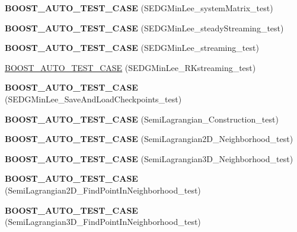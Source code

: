 \begin{DoxyCompactItemize}
\item 
\hypertarget{namespacenatrium_a7510cddf2a5057595ad4e7f3c7bddff8}{
{\bfseries BOOST\_\-AUTO\_\-TEST\_\-CASE} (SEDGMinLee\_\-systemMatrix\_\-test)}
\label{namespacenatrium_a7510cddf2a5057595ad4e7f3c7bddff8}

\item 
\hypertarget{namespacenatrium_ae9b4ffa9f8ace78360f43adc88f28bee}{
{\bfseries BOOST\_\-AUTO\_\-TEST\_\-CASE} (SEDGMinLee\_\-steadyStreaming\_\-test)}
\label{namespacenatrium_ae9b4ffa9f8ace78360f43adc88f28bee}

\item 
\hypertarget{namespacenatrium_a635e77494362fb2b4f16eefebcd688b3}{
{\bfseries BOOST\_\-AUTO\_\-TEST\_\-CASE} (SEDGMinLee\_\-streaming\_\-test)}
\label{namespacenatrium_a635e77494362fb2b4f16eefebcd688b3}

\item 
\hyperlink{namespacenatrium_a5d50c8f7b1a7391f2433de8b308a11e7}{BOOST\_\-AUTO\_\-TEST\_\-CASE} (SEDGMinLee\_\-RKstreaming\_\-test)
\item 
\hypertarget{namespacenatrium_ae770b0311667837cbe15679c4f642d8d}{
{\bfseries BOOST\_\-AUTO\_\-TEST\_\-CASE} (SEDGMinLee\_\-SaveAndLoadCheckpoints\_\-test)}
\label{namespacenatrium_ae770b0311667837cbe15679c4f642d8d}

\item 
\hypertarget{namespacenatrium_a883618d1bfe54362b6fe566b33a125c4}{
{\bfseries BOOST\_\-AUTO\_\-TEST\_\-CASE} (SemiLagrangian\_\-Construction\_\-test)}
\label{namespacenatrium_a883618d1bfe54362b6fe566b33a125c4}

\item 
\hypertarget{namespacenatrium_ae598f215914e7095e4689e52a46ae220}{
{\bfseries BOOST\_\-AUTO\_\-TEST\_\-CASE} (SemiLagrangian2D\_\-Neighborhood\_\-test)}
\label{namespacenatrium_ae598f215914e7095e4689e52a46ae220}

\item 
\hypertarget{namespacenatrium_a6ef21ff5bbdcea455ad5ec1c82c09009}{
{\bfseries BOOST\_\-AUTO\_\-TEST\_\-CASE} (SemiLagrangian3D\_\-Neighborhood\_\-test)}
\label{namespacenatrium_a6ef21ff5bbdcea455ad5ec1c82c09009}

\item 
\hypertarget{namespacenatrium_ac86883f17cf49cbc2da6538b669f4da3}{
{\bfseries BOOST\_\-AUTO\_\-TEST\_\-CASE} (SemiLagrangian2D\_\-FindPointInNeighborhood\_\-test)}
\label{namespacenatrium_ac86883f17cf49cbc2da6538b669f4da3}

\item 
\hypertarget{namespacenatrium_a193f933a32473e494d79e6497fde0e2c}{
{\bfseries BOOST\_\-AUTO\_\-TEST\_\-CASE} (SemiLagrangian3D\_\-FindPointInNeighborhood\_\-test)}
\label{namespacenatrium_a193f933a32473e494d79e6497fde0e2c}


\end{DoxyCompactItemize}
